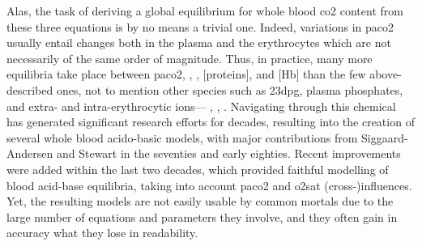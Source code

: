 Alas, the task of deriving a global equilibrium for whole blood \gls{co2} content from these three equations is by no means a trivial one. Indeed, variations in \gls{paco2} usually entail \pH{} changes both in the plasma and the erythrocytes which are not necessarily of the same order of magnitude. Thus, in practice, many more equilibria take place between \gls{paco2}, \pH, \ce{[HCO3^-]}, [proteins], and [Hb] than the few above-described ones, not to mention other species such as \gls{23dpg}, plasma phosphates, and extra- and intra-erythrocytic ions---\ie{} , , \etc{}. Navigating through this chemical  has generated significant research efforts for decades, resulting into the creation of several whole blood acido-basic models, with major contributions from Siggaard-Andersen\cite{siggaard1974acid} and Stewart\cite{stewart1981understand} in the seventies and early eighties. Recent improvements were added within the last two decades, which provided faithful modelling of blood acid-base equilibria, taking into account \gls{paco2} and \gls{o2sat} (cross-)influences\cite{rees2010, oneill2017, jezek2018}. Yet, the resulting models are not easily usable by common mortals due to the large number of equations and parameters they involve, and they often gain in accuracy what they lose in readability.

